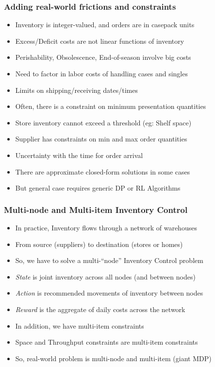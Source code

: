 \documentclass[handout]{beamer}
\begin{document}
\begin{frame}
\frametitle{Adding real-world frictions and constraints}
\pause
\begin{itemize}[<+->]
\item Inventory is integer-valued, and orders are in casepack units
\item Excess/Deficit costs are not linear functions of inventory
\item Perishability, Obsolescence, End-of-season involve big costs 
\item Need to factor in labor costs of handling cases and singles
\item Limits on shipping/receiving dates/times
\item Often, there is a constraint on minimum presentation quantities
\item Store inventory cannot exceed a threshold (eg: Shelf space)
\item Supplier has constraints on min and max order quantities
\item Uncertainty with the time for order arrival
\item There are approximate closed-form solutions in some cases
\item But general case requires generic DP or RL Algorithms
\end{itemize}
\end{frame}

\begin{frame}
\frametitle{Multi-node and Multi-item Inventory Control}
\pause
\begin{itemize}[<+->]
\item In practice, Inventory flows through a network of warehouses
\item From source (suppliers) to destination (stores or homes)
\item So, we have to solve a multi-``node'' Inventory Control problem
\item {\em State} is joint inventory across all nodes (and between nodes)
\item {\em Action} is recommended movements of inventory between nodes
\item {\em Reward} is the aggregate of daily costs across the network
\item In addition, we have multi-item constraints
\item Space and Throughput constraints are multi-item constraints
\item So, real-world problem is multi-node and multi-item (giant MDP)
\end{itemize}
\end{frame}
\end{document}
